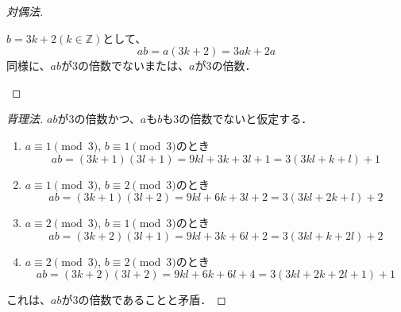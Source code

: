 \documentclass[a4paper,12pt]{ltjsarticle}
\begin{document}
\begin{enumerate}[(1)]
\begin{proof}[対偶法]
\begin{enumerate}[(i)]
                    $b = 3k + 2 (k \in \mathbb{Z})$として、
                    \begin{equation*}
                        ab = a(3k + 2) = 3ak + 2a
                    \end{equation*}
                    同様に、$ab$が3の倍数でないまたは、$a$が3の倍数．
            \end{enumerate}
        \end{proof}
        \begin{proof}[背理法]
            $ab$が3の倍数かつ、$a$も$b$も3の倍数でないと仮定する．
            \begin{enumerate}
                \item $a \equiv 1 \pmod 3$, $b \equiv 1 \pmod 3$のとき
                    \begin{equation*}
                        ab = (3k + 1)(3l + 1) = 9kl + 3k + 3l + 1 = 3(3kl + k + l) + 1
                    \end{equation*}
                \item $a \equiv 1 \pmod 3$, $b \equiv 2 \pmod 3$のとき
                    \begin{equation*}
                        ab = (3k + 1)(3l + 2) = 9kl + 6k + 3l + 2 = 3(3kl + 2k + l) + 2
                    \end{equation*}
                \item $a \equiv 2 \pmod 3$, $b \equiv 1 \pmod 3$のとき
                    \begin{equation*}
                        ab = (3k + 2)(3l + 1) = 9kl + 3k + 6l + 2 = 3(3kl + k + 2l) + 2
                    \end{equation*}
                \item $a \equiv 2 \pmod 3$, $b \equiv 2 \pmod 3$のとき
                    \begin{equation*}
                        ab = (3k + 2)(3l + 2) = 9kl + 6k + 6l + 4 = 3(3kl + 2k + 2l + 1) + 1
                    \end{equation*}
            \end{enumerate}
            これは、$ab$が3の倍数であることと矛盾．
        \end{proof}
\end{enumerate}
\end{document}
